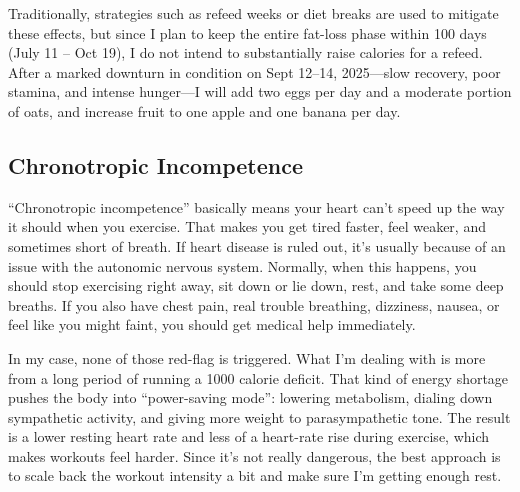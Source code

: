 Traditionally, strategies such as refeed weeks or diet breaks are used to mitigate these effects, but since I plan to keep the entire fat-loss phase within 100 days (July 11 – Oct 19), I do not intend to substantially raise calories for a refeed. After a marked downturn in condition on Sept 12–14, 2025—slow recovery, poor stamina, and intense hunger—I will add two eggs per day and a moderate portion of oats, and increase fruit to one apple and one banana per day.

\subsection{Chronotropic Incompetence}
“Chronotropic incompetence” basically means your heart can’t speed up the way it should when you exercise. That makes you get tired faster, feel weaker, and sometimes short of breath. If heart disease is ruled out, it’s usually because of an issue with the autonomic nervous system. Normally, when this happens, you should stop exercising right away, sit down or lie down, rest, and take some deep breaths. If you also have chest pain, real trouble breathing, dizziness, nausea, or feel like you might faint, you should get medical help immediately.

In my case, none of those red-flag is triggered. What I’m dealing with is more from a long period of running a 1000 calorie deficit. That kind of energy shortage pushes the body into “power-saving mode”: lowering metabolism, dialing down sympathetic activity, and giving more weight to parasympathetic tone. The result is a lower resting heart rate and less of a heart-rate rise during exercise, which makes workouts feel harder. Since it’s not really dangerous, the best approach is to scale back the workout intensity a bit and make sure I’m getting enough rest.